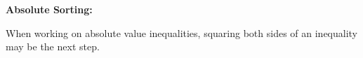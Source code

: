 \documentclass[letterpaper,12pt]{article}
\begin{document}
\textbf{Absolute Sorting:}


When working on absolute value inequalities, squaring both sides of an inequality may be the next step.
\end{document}

